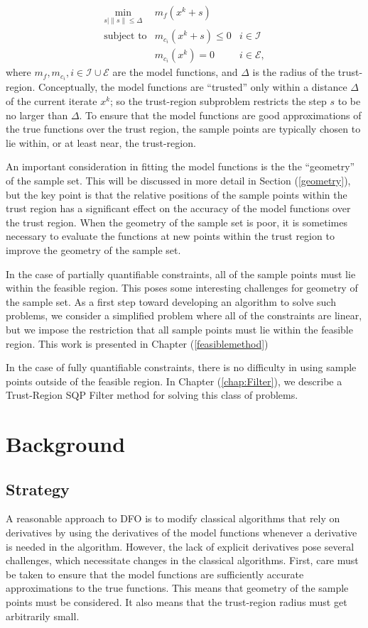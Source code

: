 \documentclass{article}
\newcommand{\norm}[1]{\| #1 \|}
\newcommand{\union}{\cup}
\let\oldref\ref
\renewcommand{\ref}[1]{(\oldref{#1})}
\begin{document}
\[ \begin{array}{ccl} \min_{s| \norm{s} \le \Delta}
 & m_{f}(x^k+s) \\
\mbox{subject to} & m_{c_i}(x^k+s) \le 0 & i \in \mathcal{I} \\
& m_{c_i}(x^k) = 0 & i \in \mathcal{E},
\end{array}
\]
where $m_{f}, m_{c_i}, i \in \mathcal{I} \union \mathcal{E}$ are the model functions, and $\Delta$ is the radius of the trust-region.
Conceptually, the model functions are ``trusted'' only within a distance $\Delta$ of the current iterate $x^k$; so the trust-region subproblem restricts the step $s$ to be no larger than $\Delta$.
To ensure that the model functions are good approximations of the true functions over the trust region, the sample points are typically chosen to lie within, or at least near, the trust-region.


An important consideration in fitting the model functions is the the ``geometry'' of the sample set.  This will be discussed in more detail in Section \ref{geometry}, but the key point is that the relative positions of the sample points within the trust region has a significant effect on the accuracy of the model functions over the trust region.  When the geometry of the sample set is poor, it is sometimes necessary to evaluate the functions at new points within the trust region to improve the geometry of the sample set.  

In the case of partially quantifiable constraints, all of the sample points must lie within the feasible region.  This poses some interesting challenges for geometry of the sample set.  As a first step toward developing an algorithm to solve such problems, we consider a simplified problem where all of the constraints are linear, but we impose the restriction that all sample points must lie within the feasible region.  This work is presented in Chapter \ref{feasiblemethod}

In the case of fully quantifiable constraints, there is no difficulty in using sample points outside of the feasible region.  
In Chapter \ref{chap:Filter}, we describe a Trust-Region SQP Filter method for solving this class of problems.

  
  
  
\section{Background}

\subsection{Strategy}
A reasonable approach to DFO is to modify classical algorithms that rely on derivatives by using the derivatives of the model functions whenever a derivative is needed in the algorithm.
However, the lack of explicit derivatives pose several challenges, which necessitate changes in the classical algorithms.
First, care must be taken to ensure that the model functions are sufficiently accurate approximations to the true functions.
This means that geometry of the sample points must be considered.
It also means that the trust-region radius must get arbitrarily small.
\end{document}

